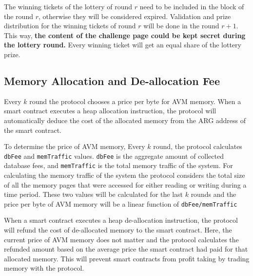 The winning tickets of the lottery of round $r$ need to be included in the block of the round $r$,
otherwise they will be considered expired. Validation and prize distribution for the winning tickets of round
$r$ will be done in the round $r + 1$. This way, \textbf{the content of the challenge page could be
kept secret during the lottery round.} Every winning ticket will get an equal share of the lottery prize.

\subsection{Memory Allocation and De-allocation Fee}\label{subsec:memory-allocation-and-de-allocation}

Every $k$ round the protocol chooses a price per byte for AVM memory. When a smart contract executes a heap
allocation instruction, the protocol will automatically deduce the cost of the allocated memory from the ARG
address of the smart contract.

To determine the price of AVM memory, Every $k$ round, the protocol calculates \texttt{dbFee} and
\texttt{memTraffic} values. \texttt{dbFee} is the aggregate amount of collected database fees, and
\texttt{memTraffic} is the total memory traffic of the system. For calculating the memory traffic of the system
the protocol considers the total size of all the memory pages that were accessed for either reading or writing
during a time period. These two values will be calculated for the last $k$ rounds and the price per byte of
AVM memory will be a linear function of \texttt{dbFee/memTraffic}

When a smart contract executes a heap de-allocation instruction, the protocol will refund the cost of
de-allocated memory to the smart contract. Here, the current price of AVM memory does not matter and the protocol
calculates the refunded amount based on the average price the smart contract had paid for that allocated memory.
This will prevent smart contracts from profit taking by trading memory with the protocol.